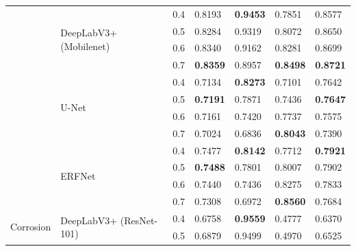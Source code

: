 \documentclass[journal]{IEEEtran}
\begin{document}
\begin{table}[t]
\begin{tabular}{p{1.5cm}p{3.5cm}p{1cm}p{1cm}p{1cm}p{1cm}p{1cm}}
        \cmidrule{2-7}
        & \multirow{4}{3.5cm}{DeepLabV3+ (Mobilenet)}   & 0.4      & 0.8193           & \textbf{0.9453} & 0.7851          & 0.8577             \\
        &                                               & 0.5      & 0.8284           & 0.9319          & 0.8072          & 0.8650             \\
        &                                               & 0.6      & 0.8340           & 0.9162          & 0.8281          & 0.8699             \\
        &                                               & 0.7      & \textbf{0.8359}  & 0.8957          & \textbf{0.8498} & \textbf{0.8721}    \\
        \cmidrule{2-7}
        & \multirow{4}{3.5cm}{U-Net}                    & 0.4      & 0.7134           & \textbf{0.8273} & 0.7101          & 0.7642             \\
        &                                               & 0.5      & \textbf{0.7191}  & 0.7871          & 0.7436          & \textbf{0.7647}    \\
        &                                               & 0.6      & 0.7161           & 0.7420          & 0.7737          & 0.7575             \\
        &                                               & 0.7      & 0.7024           & 0.6836          & \textbf{0.8043} & 0.7390             \\
        \cmidrule{2-7}
        & \multirow{4}{3.5cm}{ERFNet}                   & 0.4      & 0.7477           & \textbf{0.8142} & 0.7712          & \textbf{0.7921}    \\
        &                                               & 0.5      & \textbf{0.7488}  & 0.7801          & 0.8007          & 0.7902             \\
        &                                               & 0.6      & 0.7440           & 0.7436          & 0.8275          & 0.7833             \\
        &                                               & 0.7      & 0.7308           & 0.6972          & \textbf{0.8560} & 0.7684             \\
        \midrule
        \multirow{20}{1.5cm}{Corrosion} 
        & \multirow{4}{3.5cm}{DeepLabV3+ (ResNet-101)}  & 0.4      & 0.6758           & \textbf{0.9559} & 0.4777          & 0.6370             \\
        &                                               & 0.5      & 0.6879           & 0.9499          & 0.4970          & 0.6525             \\

\end{tabular}
\end{table}
\end{document}
